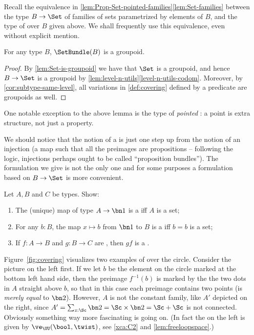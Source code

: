 Recall the equivalence in \cref{lem:Prop-Set-pointed-families}\ref{lem:Set-families}
between the type $B\to\Set$ of families of sets parametrized by elements of $B$, and the type
of \coverings over $B$ given above.
We shall frequently use this equivalence, even without explicit mention.

\begin{lemma}\label{lem:setbundle-is-groupoid}
For any type $B$, $\SetBundle(B)$ is a groupoid.
\end{lemma}
\begin{proof}
By \cref{lem:Set-is-groupoid} we have that $\Set$ is a groupoid,
and hence $B\to\Set$ is a groupoid by \cref{lem:level-n-utils}\ref{level-n-utils-codom}.
Moreover, by \cref{cor:subtype-same-level}, all variations in \cref{def:covering}
defined by a predicate are groupoids as well.
\end{proof}
One notable exception to the above lemma is the type of \emph{pointed} \coverings:
a point is extra structure, not just a property.

We should notice that the notion of a \covering is just one step up from the notion of an
injection (a map such that all the preimages are propositions --
following the logic, injections perhaps ought to be called ``proposition bundles'').
The formulation we give is not the only one and for some purposes a formulation
based on $B\to\Set$ is more convenient.

\begin{xca}\label{xca:constant-cover}
Let $A,B$ and $C$ be types. Show:
\begin{enumerate}
\item The (unique) map of type $A\to\bn 1$ is a \covering iff $A$ is a set;
\item For any $b:B$, the map $x \mapsto b$ from $\bn 1$ to $B$ is
a \covering iff $b=b$ is a set;
\item If $f: A\to B$ and $g: B\to C$ are \coverings, then $gf$ is a \covering.\endproof
\end{enumerate}
\end{xca}

Figure~\ref{fig:covering} visualizes two examples of \coverings over the circle.
Consider the picture on the left first.
If we let $b$ be the element on the circle marked at the bottom left hand side,
then the preimage $f^{-1}(b)$ is marked by the the two dots in $A$ straight above $b$,
so that in this case each preimage contains two points (is \emph{merely equal} to $\bn 2$).
However, $A$ is not the constant family, like $A'$ depicted on the right, since
$A'=\sum_{z:\Sc}\bn 2=\Sc\times\bn 2=\Sc+\Sc$ is not connected.
Obviously something way more fascinating is going on.
(In fact the \covering on the left is given by $\ve_\UU(\bool,\twist)$,
see \cref{xca:C2} and \cref{lem:freeloopspace}.)

